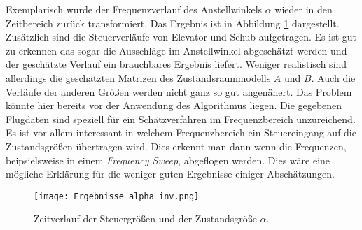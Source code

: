 Exemplarisch wurde der Frequenzverlauf des Anstellwinkels $\alpha$ wieder in den Zeitbereich zurück transformiert. Das Ergebnis ist in Abbildung \ref{fig:Ergebnisse_t} dargestellt. Zusätzlich sind die Steuerverläufe von Elevator und Schub aufgetragen. Es ist gut zu erkennen das sogar die Ausschläge im Anstellwinkel abgeschätzt werden und der geschätzte Verlauf ein brauchbares Ergebnis liefert. Weniger realistisch sind allerdings die geschätzten Matrizen des Zustandsraummodells $A$ und $B$. Auch die Verläufe der anderen Größen werden nicht ganz so gut angenähert. Das Problem könnte hier bereits vor der Anwendung des Algorithmus liegen. Die gegebenen Flugdaten sind speziell für ein Schätzverfahren im Frequenzbereich unzureichend. Es ist vor allem interessant in welchem Frequenzbereich ein Steuereingang auf die Zustandsgrößen übertragen wird. Dies erkennt man dann wenn die Frequenzen, beipsielsweise in einem \textit{Frequency Sweep}, abgeflogen werden. Dies wäre eine mögliche Erklärung für die weniger guten Ergebnisse einiger Abschätzungen.

\begin{figure}[h!]
	\centering
	\texttt{[image: Ergebnisse\_alpha\_inv.png]}
	\caption{Zeitverlauf der Steuergrößen und der Zustandsgröße $\alpha$.}
	\label{fig:Ergebnisse_t}
\end{figure}